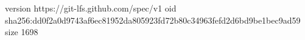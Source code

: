 version https://git-lfs.github.com/spec/v1
oid sha256:dd0f2a0d9743af6ec81952da805923fd72b80c34963fefd2d6bd9be1bec9ad59
size 1698
